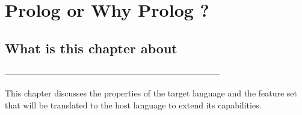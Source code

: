\documentclass[thesis-solanki.tex]{subfiles}
\begin{document}
\chapter{Prolog or Why Prolog ?}\label{chap:pwp}


\section{What is this chapter about}

-----------------------------------------------------------------------------

This chapter discusses the properties of the target language  and the feature set that will be translated to the host 
language to extend its capabilities.
\end{document}
